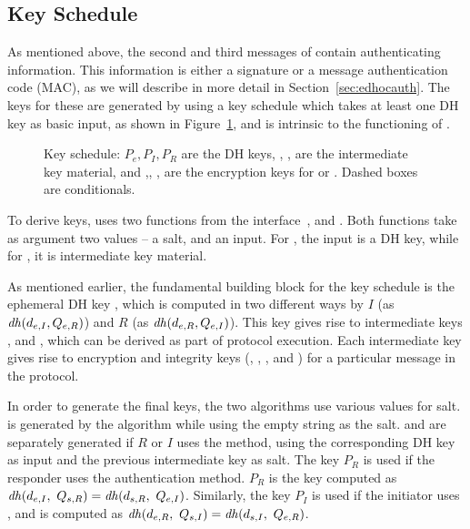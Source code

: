 \subsection{Key Schedule}
\label{sec:keysched}
As mentioned above, the second and third messages of \mEdhoc{} contain
authenticating information.
%
This information is either a signature or a message authentication code (MAC),
as we will describe in more detail in Section~\ref{sec:edhocauth}.
%
The keys for these are generated by using a key schedule which takes at least
one DH key \mGxy{} as basic input, as shown in Figure~\ref{fig:kdfdiagram},
and is intrinsic to the functioning of \mEdhoc{}.
%
\begin{figure}[!h]
\scalebox{.785}{

}
\caption{Key schedule: $P_e, P_I, P_R$ are the DH keys, \mPRKtwo, 
\mPRKthree, \mPRKfour{} are the intermediate key material, and 
\mKtwoe,\mKtwom, 
\mKthreeae, \mKthreem{} are the encryption keys for \mAead{} or 
\mXor{}. Dashed boxes are conditionals.~\cite{Norr21}}
\label{fig:kdfdiagram}
\end{figure}
%

To derive keys, \mEdhoc{} uses two functions from the \mHkdf{}
interface~\cite{rfc5869}, \mHkdfExtract{} and \mHkdfExpand{}.
%
Both functions take as argument two values -- a salt, and an input.
%
For \mHkdfExtract{}, the input is a DH key, while for \mHkdfExpand{},
it is intermediate key material.
%

As mentioned earlier, the fundamental building block for the key schedule is
the ephemeral DH key \mGxy{}, which is computed in two different ways by
$I$ (as $\mathit{dh}(d_{e,I}, Q_{e,R})$) and $R$ (as $\mathit{dh}(d_{e,R}, Q_{e,I})$).
%
This key gives rise to intermediate keys \mPRKtwo{}, \mPRKthree{} and
\mPRKfour{}, which can be derived as part of protocol execution.
%
Each intermediate key gives rise to encryption and integrity keys
(\mKtwoe, \mKtwom{}, \mKthreeae, and \mKthreem)
for a particular message in the protocol.
%

In order to generate the final keys, the two \mHkdf{} algorithms use various
values for salt.
%
\mPRKtwo{} is generated by the \mHkdfExtract{} algorithm while using the 
empty
string as the salt.
%
\mPRKthree{} and \mPRKfour{} are separately generated if $R$ or $I$ uses the
\mStat{} method, using the corresponding DH key as input and the previous
intermediate key as salt.
%
The key $P_{R}$ is used if the responder uses the \mStat{} authentication 
method.
%
$P_{R}$ is the key computed as $\mDH(\mX,\ \mGr{}) = \mDH(\mPriv{R},\ 
\mGx)$.
%
Similarly, the key $P_{I}$ is used if the initiator uses \mStat{}, and is 
computed as $\mDH(\mY,\ \mGi{}) = \mDH(\mPriv{I},\ \mGy)$.
%

